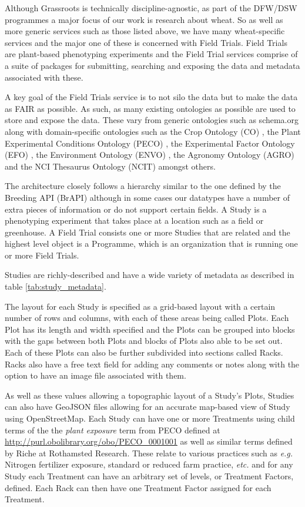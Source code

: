 \documentclass[12pt,a4paper]{extarticle}
\begin{document}
Although Grassroots is technically discipline-agnostic, as part of the DFW/DSW programmes a major focus of our work is research about wheat. 
So as well as more generic services such as those listed above, we have many wheat-specific services and the major one of these is concerned with Field Trials.
Field Trials are plant-based phenotyping experiments and the Field Trial services comprise of a suite of packages for submitting, searching and exposing the data and metadata associated with these. 

A key goal of the Field Trials service is to not silo the data but to make the data as FAIR\cite{fair_data} as possible. 
As such, as many existing ontologies as possible are used to store and expose the data. 
These vary from generic ontologies such as schema.org along with domain-specific ontologies such as the Crop Ontology (CO) \cite{co}, the Plant Experimental Conditions Ontology (PECO) \cite{peco}, the Experimental Factor Ontology (EFO) \cite{efo}, the Environment Ontology (ENVO) \cite{envo}, the Agronomy Ontology (AGRO) \cite{agro} and the NCI Thesaurus Ontology (NCIT) \cite{ncit} amongst others. 

The architecture closely follows a hierarchy similar to the one defined by the Breeding API (BrAPI) \cite{brapi} although in some cases our datatypes have a number of extra pieces of information or do not support certain fields. 
A Study is a phenotyping experiment that takes place at a location such as a field or greenhouse. 
A Field Trial consists one or more Studies that are related and the highest level object is a Programme, which is an organization that is running one or more Field Trials. 

Studies are richly-described and have a wide variety of metadata as described in table \ref{tab:study_metadata}.

The layout for each Study is specified as a grid-based layout with a certain number of rows and columns, with each of these areas being called Plots. 
Each Plot has its length and width specified and the Plots can be grouped into blocks with the gaps between both Plots and blocks of Plots also able to be set out. 
Each of these Plots can also be further subdivided into sections called Racks.
Racks also have a free text field for adding any comments or notes along with the option to have an image file associated with them.

As well as these values allowing a topographic layout of a Study's Plots, Studies can also have GeoJSON files allowing for an accurate map-based view of Study using OpenStreetMap.
Each Study can have one or more Treatments using child terms of the the \textit{plant exposure} term from PECO defined at \url{http://purl.obolibrary.org/obo/PECO_0001001} as well as similar terms defined by Riche at Rothamsted Research. 
These relate to various practices such as \textit{e.g.} Nitrogen fertilizer exposure, standard or reduced farm practice, \textit{etc.} and for any Study each Treatment can have an arbitrary set of levels, or Treatment Factors, defined. 
Each Rack can then have one Treatment Factor assigned for each Treatment.
\end{document}
